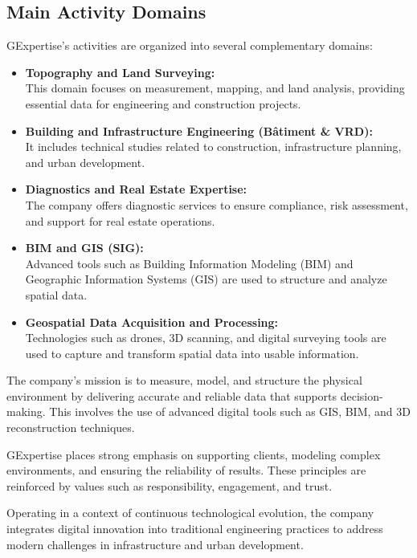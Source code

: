 \subsection{Main Activity Domains}

GExpertise’s activities are organized into several complementary domains:

\begin{itemize}
    \item \textbf{Topography and Land Surveying:} \\
    This domain focuses on measurement, mapping, and land analysis, providing essential data for engineering and construction projects.

    \item \textbf{Building and Infrastructure Engineering (Bâtiment \& VRD):} \\
    It includes technical studies related to construction, infrastructure planning, and urban development.

    \item \textbf{Diagnostics and Real Estate Expertise:} \\
    The company offers diagnostic services to ensure compliance, risk assessment, and support for real estate operations.

    \item \textbf{BIM and GIS (SIG):} \\
    Advanced tools such as Building Information Modeling (BIM) and Geographic Information Systems (GIS) are used to structure and analyze spatial data.

    \item \textbf{Geospatial Data Acquisition and Processing:} \\
    Technologies such as drones, 3D scanning, and digital surveying tools are used to capture and transform spatial data into usable information.
\end{itemize}

The company’s mission is to measure, model, and structure the physical environment by delivering accurate and reliable data that supports decision-making. This involves the use of advanced digital tools such as GIS, BIM, and 3D reconstruction techniques.

GExpertise places strong emphasis on supporting clients, modeling complex environments, and ensuring the reliability of results. These principles are reinforced by values such as responsibility, engagement, and trust.

Operating in a context of continuous technological evolution, the company integrates digital innovation into traditional engineering practices to address modern challenges in infrastructure and urban development.

